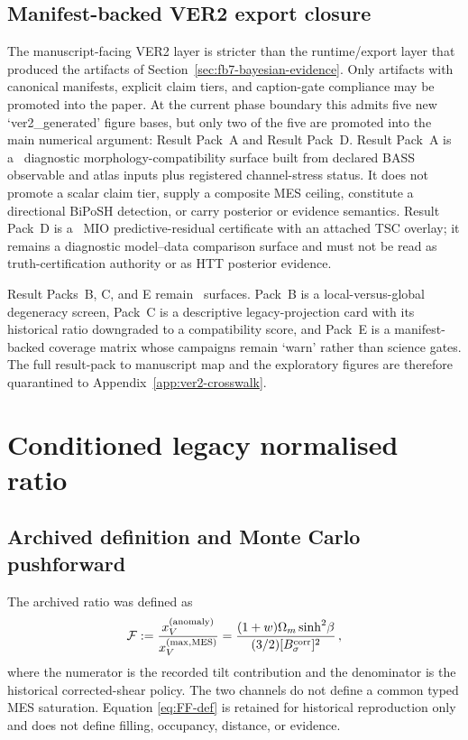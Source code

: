 \subsection{Manifest-backed VER2 export closure}
\label{sec:ver2-export-closure}

The manuscript-facing VER2 layer is stricter than the runtime/export
layer that produced the artifacts of Section~\ref{sec:fb7-bayesian-evidence}.
Only artifacts with canonical manifests, explicit claim tiers, and
caption-gate compliance may be promoted into the paper.  At the current
phase boundary this admits five new `ver2\_generated' figure bases, but
only two of the five are promoted into the main numerical argument:
Result Pack~A and Result Pack~D.  Result Pack~A is a
\ConditionalStatus\ diagnostic morphology-compatibility surface built
from declared BASS observable and atlas inputs plus registered
channel-stress status.  It does not promote a scalar claim tier, supply
a composite MES ceiling, constitute a directional BiPoSH detection, or
carry posterior or evidence semantics.  Result
Pack~D is a \ConditionalStatus\ MIO predictive-residual certificate with
an attached TSC overlay; it remains a diagnostic model--data comparison
surface and must not be read as truth-certification authority or as HTT posterior
evidence.

Result Packs~B, C, and E remain \ExploratoryStatus\ surfaces.  Pack~B
is a local-versus-global degeneracy screen, Pack~C is a descriptive
legacy-projection card with its historical ratio downgraded to a
compatibility score, and Pack~E is a manifest-backed coverage matrix
whose campaigns remain `warn' rather than science gates.  The
full result-pack to manuscript map and the exploratory figures are
therefore quarantined to Appendix~\ref{app:ver2-crosswalk}.


\section{Conditioned legacy normalised ratio}\label{sec:filling}
\label{sec:filling-fraction}

\subsection{Archived definition and Monte Carlo pushforward}
\label{sec:filling-mc}

The archived ratio was defined as
\begin{equation}\label{eq:FF-def}
\mathcal{F} := \frac{x_V^{(\mathrm{anomaly})}}{x_V^{(\mathrm{max,MES})}}
= \frac{(1+w)\Omega_m\sinh^2\!\beta}{(3/2)[B_\sigma^{\mathrm{corr}}]^2}\,,
\end{equation}
where the numerator is the recorded tilt contribution and the
denominator is the historical corrected-shear policy.  The two
channels do not define a common typed MES saturation.  Equation
\eqref{eq:FF-def} is retained for historical reproduction only and
does not define filling, occupancy, distance, or evidence.

